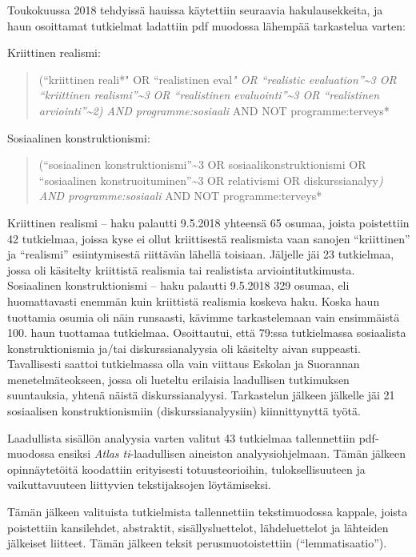 \documentclass[a4paper,11pt,finnish]{article}
\begin{document}
Toukokuussa 2018 tehdyissä hauissa käytettiin seuraavia hakulausekkeita,
ja haun osoittamat tutkielmat ladattiin pdf muodossa lähempää
tarkastelua varten:

Kriittinen realismi:

\begin{quote}
(``kriittinen reali*" OR ``realistinen eval\emph{" OR ``realistic
evaluation''\textasciitilde{}3 OR ``kriittinen
realismi''\textasciitilde{}3 OR ``realistinen
evaluointi''\textasciitilde{}3 OR ``realistinen
arviointi''\textasciitilde{}2) AND programme:sosiaali} AND NOT
programme:terveys*
\end{quote}

Sosiaalinen konstruktionismi:

\begin{quote}
(``sosiaalinen konstruktionismi''\textasciitilde{}3 OR
sosiaalikonstruktionismi OR ``sosiaalinen
konstruoituminen''\textasciitilde{}3 OR relativismi OR
diskurssianalyy\emph{) AND programme:sosiaali} AND NOT
programme:terveys*
\end{quote}

Kriittinen realismi -- haku palautti 9.5.2018 yhteensä 65 osumaa, joista
poistettiin 42 tutkielmaa, joissa kyse ei ollut kriittisestä realismista
vaan sanojen ``kriittinen'' ja ``realismi'' esiintymisestä riittävän
lähellä toisiaan. Jäljelle jäi 23 tutkielmaa, jossa oli käsitelty
kriittistä realismia tai realistista arviointitutkimusta. Sosiaalinen
konstruktionismi -- haku palautti 9.5.2018 329 osumaa, eli huomattavasti
enemmän kuin kriittistä realismia koskeva haku. Koska haun tuottamia
osumia oli näin runsaasti, kävimme tarkastelemaan vain ensimmäistä 100.
haun tuottamaa tutkielmaa. Osoittautui, että 79:ssa tutkielmassa
sosiaalista konstruktionismia ja/tai diskurssianalyysia oli käsitelty
aivan suppeasti. Tavallisesti saattoi tutkielmassa olla vain viittaus
Eskolan ja Suorannan menetelmäteokseen, jossa oli lueteltu erilaisia
laadullisen tutkimuksen suuntauksia, yhtenä näistä diskurssianalyysi.
Tarkastelun jälkeen jälkelle jäi 21 sosiaalisen konstruktionismiin
(diskurssianalyysiin) kiinnittynyttä työtä.

Laadullista sisällön analyysia varten valitut 43 tutkielmaa
tallennettiin pdf-muodossa ensiksi \emph{Atlas ti}-laadullisen aineiston
analyysiohjelmaan. Tämän jälkeen opinnäytetöitä koodattiin erityisesti
totuusteorioihin, tuloksellisuuteen ja vaikuttavuuteen liittyvien
tekstijaksojen löytämiseksi.

Tämän jälkeen valituista tutkielmista tallennettiin tekstimuodossa
kappale, joista poistettiin kansilehdet, abstraktit, sisällysluettelot,
lähdeluettelot ja lähteiden jälkeiset liitteet. Tämän jälkeen teksit
perusmuotoistettiin (``lemmatisaatio'').
\end{document}
